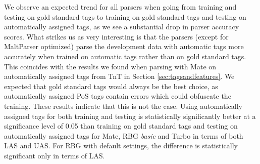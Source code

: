 \documentclass[a4paper,12pt,english]{book}
\begin{document}
We observe an expected trend for all parsers when going from training and
testing on gold standard tags to training on gold standard tags and testing on
automatically assigned tags, as we see a substantial drop in parser accuracy
scores. What strikes us as very interesting is that the parsers (except for
MaltParser optimized) parse the development data with automatic tags more
accurately when trained on automatic tags rather than on gold standard tags.
This coincides with the results we found when parsing with Mate on
automatically assigned tags from TnT in Section \ref{sec:tagsandfeatures}. We
expected that gold standard tags would always be the best choice, as
automatically assigned PoS tags contain errors which could obfuscate the
training. These results indicate that this is not the case.  Using
automatically assigned tags for both training and testing is statistically
significantly better at a significance level of 0.05 than training on gold
standard tags and testing on automatically assigned tags for Mate, RBG
\emph{basic} and Turbo in terms of both LAS and UAS. For RBG with default
settings, the difference is statistically significant only in terms of LAS.

\end{document}
